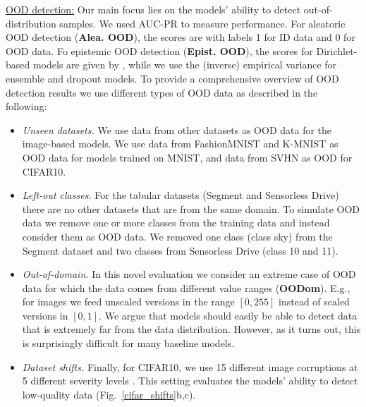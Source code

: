 \underline{OOD detection:} Our main focus lies on the models' ability to detect out-of-distribution samples. We used AUC-PR to measure performance. For aleatoric OOD detection (\textbf{Alea. OOD}), the scores are  with labels 1 for ID data and 0 for OOD data. Fo epistemic OOD detection (\textbf{Epist. OOD}), the scores for Dirichlet-based models are given by \smash{$\alpha_0\dataix = \sum_\iclass \alpha_\iclass\dataix$}, while we use the (inverse) empirical variance  for ensemble and dropout models. To provide a comprehensive overview of OOD detection results we use different types of OOD data as described in the following: 
\begin{itemize}
    \item \textit{Unseen datasets.} We use data from other datasets as OOD data for the image-based models. We use data from FashionMNIST \cite{fashionmnist} and K-MNIST \cite{kmnist}  as OOD data for models trained on MNIST, and data from SVHN \cite{svhn} as OOD for CIFAR10.
    \item \textit{Left-out classes.} For the tabular datasets (Segment and Sensorless Drive) there are no other datasets that are from the same domain. To simulate OOD data we remove one or more classes from the training data and instead consider them as OOD data. We removed one class (class sky) from the Segment dataset and two classes from Sensorless Drive (class 10 and 11).
    \item \textit{Out-of-domain.} In this novel evaluation we consider an extreme case of OOD data for which the data comes from different value ranges (\textbf{OODom}). E.g., for images we feed unscaled versions in the range $[0, 255]$ instead of scaled versions in $[0,1]$. We argue that models should easily be able to detect data that is extremely far from the data distribution. However, as it turns out, this is surprisingly difficult for many baseline models.
    \item \textit{Dataset shifts.} Finally, for CIFAR10, we use 15 different image corruptions at 5 different severity levels \cite{benchmarking-corruptions}. This setting evaluates the models' ability to detect low-quality data (Fig.~\ref{cifar_shifts}b,c). 
\end{itemize}

